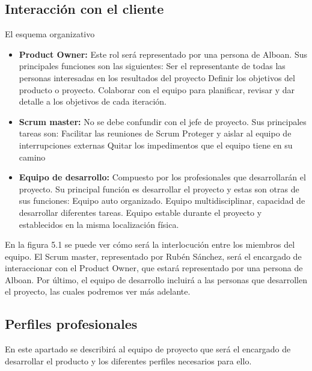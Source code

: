 \subsection{Interacción con el cliente}
El esquema organizativo

\begin{itemize}
	\item \textbf{Product Owner:} Este rol será representado por una persona de Alboan. Sus principales funciones son las siguientes:
		\subitem Ser el representante de todas las personas interesadas en los resultados del proyecto
		\subitem Definir los objetivos del producto o proyecto.
		\subitem Colaborar con el equipo para planificar, revisar y dar detalle a los objetivos de cada iteración.
	\item \textbf{Scrum master:} No se debe confundir con el jefe de proyecto. Sus principales tareas son:
		\subitem Facilitar las reuniones de Scrum
		\subitem Proteger y aislar al equipo de interrupciones externas
		\subitem Quitar los impedimentos que el equipo tiene en su camino
	\item \textbf{Equipo de desarrollo:} Compuesto por los profesionales que desarrollarán el proyecto. Su principal función es desarrollar el proyecto y estas son otras de sus funciones:
		\subitem Equipo auto organizado.
		\subitem Equipo multidisciplinar, capacidad de desarrollar diferentes tareas.
		\subitem Equipo estable durante el proyecto y establecidos en la misma localización física.

\end{itemize}

En la figura 5.1 se puede ver cómo será la interlocución entre los miembros del equipo. El Scrum master, representado por Rubén Sánchez, será el encargado de interaccionar con el Product Owner, que estará representado por una persona de Alboan. Por último, el equipo de desarrollo incluirá a las personas que desarrollen el proyecto, las cuales podremos ver más adelante.


\subsection{Perfiles profesionales}

En este apartado se describirá al equipo de proyecto que será el encargado de desarrollar el producto y los diferentes perfiles necesarios para ello.


